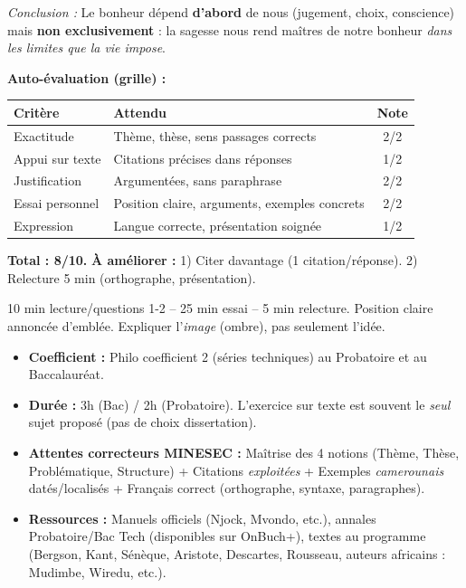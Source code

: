 \documentclass[11pt]{article}
\begin{document}
\begin{exoresolu}
\textit{Conclusion :} Le bonheur dépend \textbf{d'abord} de nous (jugement, choix, conscience) mais \textbf{non exclusivement} : la sagesse nous rend maîtres de notre bonheur \emph{dans les limites que la vie impose}.

\textbf{Auto-évaluation (grille) :}
\begin{center}
\begin{tabularx}{\linewidth}{|l|X|c|}\hline
\rowcolor{popblueL} \textbf{Critère} & \textbf{Attendu} & \textbf{Note} \\ \hline
Exactitude & Thème, thèse, sens passages corrects & 2/2 \\ \hline
Appui sur texte & Citations précises dans réponses & 1/2 \\ \hline
Justification & Argumentées, sans paraphrase & 2/2 \\ \hline
Essai personnel & Position claire, arguments, exemples concrets & 2/2 \\ \hline
Expression & Langue correcte, présentation soignée & 1/2 \\ \hline
\end{tabularx}
\end{center}
\textbf{Total : 8/10.} \textbf{À améliorer :} 1) Citer davantage (1 citation/réponse). 2) Relecture 5 min (orthographe, présentation).
\begin{attention}
10 min lecture/questions 1-2 -- 25 min essai -- 5 min relecture. Position claire annoncée d'emblée. Expliquer l'\emph{image} (ombre), pas seulement l'idée.
\end{attention}
\end{exoresolu}

\begin{savaistu}
\begin{itemize}
\item \textbf{Coefficient :} Philo coefficient 2 (séries techniques) au Probatoire et au Baccalauréat.
\item \textbf{Durée :} 3h (Bac) / 2h (Probatoire). L'exercice sur texte est souvent le \emph{seul} sujet proposé (pas de choix dissertation).
\item \textbf{Attentes correcteurs MINESEC :} Maîtrise des 4 notions (Thème, Thèse, Problématique, Structure) + Citations \emph{exploitées} + Exemples \emph{camerounais} datés/localisés + Français correct (orthographe, syntaxe, paragraphes).
\item \textbf{Ressources :} Manuels officiels (Njock, Mvondo, etc.), annales Probatoire/Bac Tech (disponibles sur OnBuch+), textes au programme (Bergson, Kant, Sénèque, Aristote, Descartes, Rousseau, auteurs africains : Mudimbe, Wiredu, etc.).
\end{itemize}
\end{savaistu}
\end{document}
